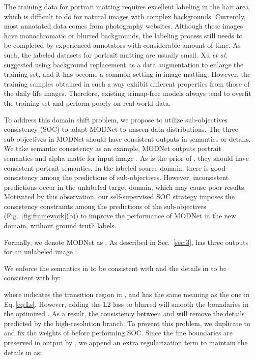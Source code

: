 \documentclass[letterpaper]{article} \usepackage{aaai22}  \usepackage{times}  \usepackage{helvet}  \usepackage{courier}  \usepackage[hyphens]{url}  \usepackage{graphicx} \urlstyle{rm} \def\UrlFont{\rm}  \usepackage{natbib}  \usepackage{caption} \usepackage{booktabs}
\begin{document}
The training data for portrait matting requires excellent labeling in the hair area, which is difficult to do for natural images with complex backgrounds. Currently, most annotated data comes from photography websites. Although these images have monochromatic or blurred backgrounds, the labeling process still needs to be completed by experienced annotators with considerable amount of time. As such, the labeled datasets for portrait matting are usually small. Xu {\it et al.} \cite{DIM} suggested using background replacement as a data augmentation to enlarge the training set, and it has become a common setting in image matting. However, the training samples obtained in such a way exhibit different properties from those of the daily life images. 
Therefore, existing trimap-free models always tend to overfit the training set and perform poorly on real-world data. 

To address this domain shift problem, we propose to utilize sub-objectives consistency (SOC) to adapt MODNet to unseen data distributions. The three sub-objectives in MODNet should have consistent outputs in semantics or details. We take semantic consistency as an example, MODNet outputs portrait semantics  and alpha matte  for input image . As  is the prior of , they should have consistent portrait semantics. In the labeled source domain, there is good consistency among the predictions of sub-objectives. However, inconsistent predictions occur in the unlabeled target domain, which may cause poor results. Motivated by this observation, our self-supervised SOC strategy imposes the consistency constraints among the predictions of the sub-objectives (Fig.~\ref{fig:framework}(b)) to improve the performance of MODNet in the new domain, without ground truth labels. 




Formally, we denote MODNet as . As described in Sec.~\ref{sec:3},  has three outputs for an unlabeled image :

We enforce the semantics in  to be consistent with  and the details in  to be consistent with  by:

where  indicates the transition region in , and  has the same meaning as the one in Eq.\,\ref{eq:Ls}.
However, adding the L2 loss to blurred  will smooth the boundaries in the optimized .
As a result, the consistency between  and  will remove the details predicted by the high-resolution branch. To prevent this problem, we duplicate  to  and fix the weights of  before performing SOC. Since the fine boundaries are preserved in  output by , we append an extra regularization term to maintain the details in  as:
\end{document}
